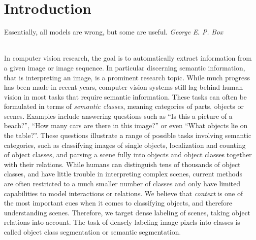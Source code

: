 \chapter{Introduction}
\vspace{1cm}
\hfill%
\begin{minipage}{.4\linewidth}
Essentially, all models are wrong, but some are useful. 
\flushright%
\emph{George E. P. Box}

\end{minipage}%
\\[2cm]
In computer vision research, the goal is to automatically extract information
from a given image or image sequence.  In particular discerning semantic
information, that is interpreting an image, is a prominent research topic.
While much progress has been made in recent years, computer vision systems still lag behind
human vision in most tasks that require semantic information. These tasks can often be formulated
in terms of \emph{semantic classes}, meaning categories of parts, objects or scenes.
Examples include answering questions such as ``Is this a picture of a beach?'', ``How many
cars are there in this image?'' or even ``What objects lie on the table?''.
These questions illustrate a range of possible tasks involving semantic categories,
such as classifying images of single objects, localization and counting of object classes,
and parsing a scene fully into objects and object classes together with their relations.
%
While humans can distinguish tens of thousands of object classes, and have
little trouble in interpreting complex scenes, current methods are often
restricted to a much smaller number of classes and only have limited
capabilities to model interactions or relations.  We believe that
\emph{context} is one of the most important cues when it comes to classifying
objects, and therefore understanding scenes. Therefore, we target dense
labeling of scenes, taking object relations into account.  The task of densely
labeling image pixels into classes is called object class segmentation or
semantic segmentation.
\pagebreak

